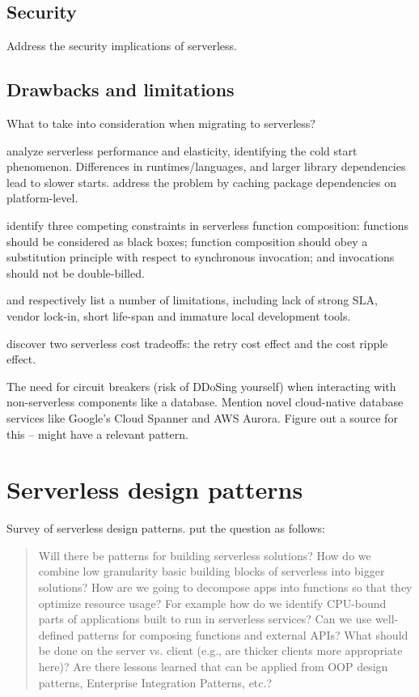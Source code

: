 \documentclass[utf8,english]{gradu3}
\begin{document}
\section{Security}

Address the security implications of serverless.

\section{Drawbacks and limitations}

What to take into consideration when migrating to serverless?

\textcite{lloydserverless} analyze serverless performance and elasticity, identifying the cold start phenomenon. Differences in runtimes/languages, and larger library dependencies lead to slower starts. \textcite{oakes17pipsqueak} address the problem by caching package dependencies on platform-level.

\textcite{baldini17trilemma} identify three competing constraints in serverless function composition: functions should be considered as black boxes; function composition should obey a substitution principle with respect to synchronous invocation; and invocations should not be double-billed.

\textcite{robert2016serverlessarchitectures} and \textcite{adzic2017serverless} respectively list a number of limitations, including lack of strong SLA, vendor lock-in, short life-span and immature local development tools.

\textcite{kuhlenkamp17costradamus} discover two serverless cost tradeoffs: the retry cost effect and the cost ripple effect.

The need for circuit breakers (risk of DDoSing yourself) when interacting with non-serverless components like a database. Mention novel cloud-native database services like Google's Cloud Spanner and AWS Aurora. Figure out a source for this -- \textcite{hohpe2004enterprise} might have a relevant pattern.

\chapter{Serverless design patterns}

Survey of serverless design patterns. \textcite{baldini17currentTrends} put the question as follows:

\begin{quote}
Will there be patterns for building serverless solutions? How do we combine low granularity basic building blocks of serverless into bigger solutions? How are we going to decompose apps into functions so that they optimize resource usage? For example how do we identify CPU-bound parts of applications built to run in serverless services? Can we use well-defined patterns for composing functions and external APIs? What should be done on the server vs. client (e.g., are thicker clients more appropriate here)? Are there lessons learned that can be applied from OOP design patterns, Enterprise Integration Patterns, etc.?
\end{quote}
\end{document}
